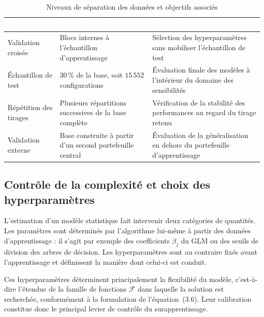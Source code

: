 \begin{table}[H]
\centering
\caption{Niveaux de séparation des données et objectifs associés}
\label{tab:separation-donnees}
\renewcommand{\arraystretch}{1.3}
\begin{tabular}{p{3.4cm} p{4.6cm} p{6.0cm}}
\toprule
\rowcolor{rougeEntreprise}
\textcolor{white}{\textbf{Niveau}} &
\textcolor{white}{\textbf{Données mobilisées}} &
\textcolor{white}{\textbf{Objectif}} \\
\midrule
Validation croisée & 
Blocs internes à l'échantillon d'apprentissage & 
Sélection des hyperparamètres sans mobiliser l'échantillon de test \\
\addlinespace
\rowcolor{rosePale}
Échantillon de test & 
$30\,\%$ de la base, soit $15\,552$ configurations & 
Évaluation finale des modèles à l'intérieur du domaine des sensibilités \\
\addlinespace
Répétition des tirages & 
Plusieurs répartitions successives de la base complète & 
Vérification de la stabilité des performances au regard du tirage retenu \\
\addlinespace
\rowcolor{rosePale}
Validation externe & 
Base construite à partir d'un second portefeuille central & 
Évaluation de la généralisation en dehors du portefeuille d'apprentissage \\
\bottomrule
\end{tabular}
\end{table}

\subsection{Contrôle de la complexité et choix des hyperparamètres}
\label{subsec:hyperparametres}

L'estimation d'un modèle statistique fait intervenir deux catégories de quantités. Les paramètres sont déterminés par l'algorithme lui-même à partir des données d'apprentissage : il s'agit par exemple des coefficients $\beta_j$ du GLM ou des seuils de division des arbres de décision. Les hyperparamètres sont au contraire fixés avant l'apprentissage et définissent la manière dont celui-ci est conduit.

Ces hyperparamètres déterminent principalement la flexibilité du modèle, c'est-à-dire l'étendue de la famille de fonctions $\mathcal{F}$ dans laquelle la solution est recherchée, conformément à la formulation de l'équation~(3.6). Leur calibration constitue donc le principal levier de contrôle du surapprentissage.


